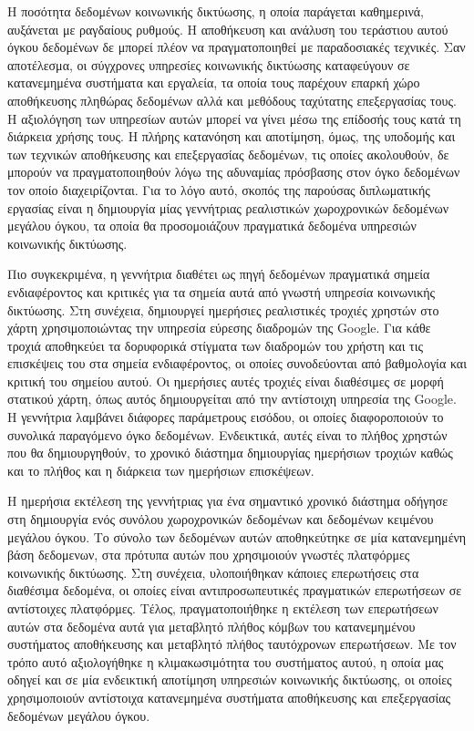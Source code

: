
\begin{abstractgr}%

Η ποσότητα δεδομένων κοινωνικής δικτύωσης, η οποία παράγεται καθημερινά, αυξάνεται με ραγδαίους ρυθμούς. Η αποθήκευση και ανάλυση του τεράστιου αυτού όγκου δεδομένων 
δε μπορεί πλέον να πραγματοποιηθεί με παραδοσιακές τεχνικές. Σαν αποτέλεσμα, οι σύγχρονες υπηρεσίες κοινωνικής δικτύωσης καταφεύγουν σε κατανεμημένα συστήματα και εργαλεία, 
τα οποία τους παρέχουν επαρκή χώρο αποθήκευσης πληθώρας δεδομένων αλλά και μεθόδους ταχύτατης \linebreak επεξεργασίας τους. Η αξιολόγηση των υπηρεσίων αυτών μπορεί να γίνει 
μέσω της επίδοσής τους κατά τη διάρκεια χρήσης τους. Η πλήρης κατανόηση και αποτίμηση, όμως, της υποδομής και των τεχνικών αποθήκευσης και επεξεργασίας δεδομένων, τις 
οποίες ακολουθούν, δε μπορούν να πραγματοποιηθούν λόγω της αδυναμίας πρόσβασης στον όγκο δεδομένων τον οποίο διαχειρίζονται. Για το λόγο αυτό, σκοπός της 
παρούσας διπλωματικής εργασίας είναι η δημιουργία μίας γεννήτριας ρεαλιστικών χωροχρονικών δεδομένων μεγάλου όγκου, τα οποία θα προσομοιάζουν πραγματικά δεδομένα 
υπηρεσιών κοινωνικής δικτύωσης. 

Πιο συγκεκριμένα, η γεννήτρια διαθέτει ως πηγή δεδομένων πραγματικά σημεία ενδιαφέροντος και κριτικές για τα σημεία αυτά από γνωστή υπηρεσία κοινωνικής δικτύωσης. 
Στη συνέχεια, δημιουργεί ημερήσιες ρεαλιστικές τροχιές χρηστών στο χάρτη χρησιμοποιώντας την υπηρεσία εύρεσης διαδρομών της Google. Για κάθε τροχιά αποθηκεύει 
τα δορυφορικά στίγματα των \linebreak διαδρομών του χρήστη και τις επισκέψεις του στα σημεία ενδιαφέροντος, οι οποίες συνοδεύονται από βαθμολογία και κριτική του σημείου αυτού. 
Οι ημερήσιες αυτές τροχιές είναι διαθέσιμες σε μορφή στατικού χάρτη, όπως αυτός δημιουργείται από την αντίστοιχη υπηρεσία της Google. Η γεννήτρια λαμβάνει διάφορες 
παράμετρους εισόδου, οι οποίες διαφοροποιούν το συνολικά παραγόμενο όγκο δεδομένων. Ενδεικτικά, αυτές είναι το πλήθος χρηστών που θα δημιουργηθούν, το 
χρονικό διάστημα δημιουργίας ημερήσιων τροχιών καθώς και το πλήθος και η διάρκεια των ημερήσιων επισκέψεων. 

Η ημερήσια εκτέλεση της γεννήτριας για ένα σημαντικό χρονικό διάστημα οδήγησε στη δημιουργία ενός συνόλου χωροχρονικών δεδομένων και δεδομένων κειμένου μεγάλου όγκου. 
Το σύνολο των δεδομένων αυτών αποθηκεύτηκε σε μία κατανεμημένη βάση δεδομενων, στα πρότυπα αυτών που χρησιμοιούν γνωστές 
πλατφόρμες κοινωνικής δικτύωσης. Στη συνέχεια, υλοποιήθηκαν κάποιες επερωτήσεις στα διαθέσιμα δεδομένα, οι οποίες είναι αντιπροσωπευτικές πραγματικών 
επερωτήσεων σε αντίστοιχες πλατφόρμες. Τέλος, πραγματοποιήθηκε η εκτέλεση των επερωτήσεων αυτών στα δεδομένα αυτά για μεταβλητό πλήθος 
κόμβων του κατανεμημένου συστήματος αποθήκευσης και μεταβλητό πλήθος ταυτόχρονων επερωτήσεων. Με τον τρόπο αυτό αξιολογήθηκε η κλιμακωσιμότητα του συστήματος αυτού, η οποία μας οδηγεί και σε μία 
ενδεικτική αποτίμηση υπηρεσιών κοινωνικής δικτύωσης, οι οποίες χρησιμοποιούν αντίστοιχα κατανεμημένα συστήματα αποθήκευσης και επεξεργασίας 
δεδομένων μεγάλου όγκου.



\end{abstractgr}
